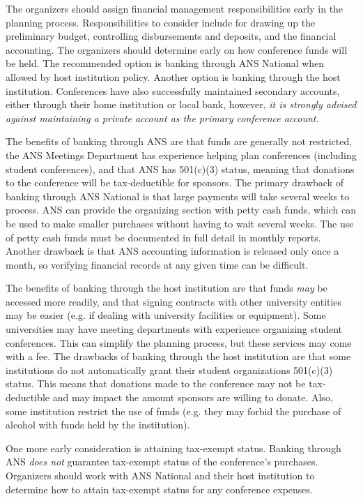\documentclass[12pt]{article}
\begin{document}
The organizers should assign financial management responsibilities early in the planning process.
Responsibilities to consider include for drawing up the preliminary budget, controlling disbursements and deposits, and the financial accounting.
The organizers should determine early on how conference funds will be held.
The recommended option is banking through ANS National when allowed by host institution policy.
Another option is banking through the host institution.
Conferences have also successfully maintained secondary accounts, either through their home institution or local bank, however, \emph{it is strongly advised against maintaining a private account as the primary conference account.}

The benefits of banking through ANS are that funds are generally not restricted, the ANS Meetings Department has experience helping plan conferences (including student conferences), and that ANS has 501(c)(3) status, meaning that donations to the conference will be tax-deductible for sponsors.
The primary drawback of banking through ANS National is that large payments will take several weeks to process.
ANS can provide the organizing section with petty cash funds, which can be used to make smaller purchases without having to wait several weeks.
The use of petty cash funds must be documented in full detail in monthly reports.
Another drawback is that ANS accounting information is released only once a month, so verifying financial records at any given time can be difficult.

The benefits of banking through the host institution are that funds \emph{may} be accessed more readily, and that signing contracts with other university entities may be easier  (e.g. if dealing with university facilities or equipment).
Some universities may have meeting departments with experience organizing student conferences.
This can simplify the planning process, but these services may come with a fee.
The drawbacks of banking through the host institution are that some institutions do not automatically grant their student organizations 501(c)(3) status. 
This means that donations made to the conference may not be tax-deductible and may impact the amount sponsors are willing to donate.
Also, some institution restrict the use of funds (e.g. they may forbid the purchase of alcohol with funds held by the institution).

One more early consideration is attaining tax-exempt status.
Banking through ANS \emph{does not} guarantee tax-exempt status of the conference's purchases.
Organizers should work with ANS National and their host institution to determine how to attain tax-exempt status for any conference expenses.
\end{document}
